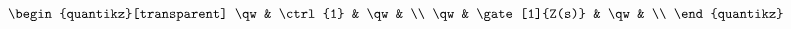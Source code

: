 \documentclass[10pt]{article}
\begin{document}
\[\begin{quantikz}[transparent]
    \qw &     \ctrl{1}   & \qw & \\
    \qw &     \gate[1]{Z(s)}                            & \qw & \\
\end{quantikz}
\]
\end{document}

